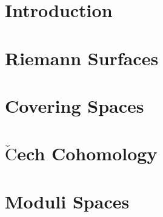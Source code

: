 \documentclass[a4paper, 8pt, notitlepage]{extreport}
\begin{document}
    

    \chapter{Introduction}\label{I}
    
    

    \chapter{Riemann Surfaces}\label{RS}
    
    

    \chapter{Covering Spaces}\label{CS}
    
    

    \chapter{$\check{\textrm{C}}$ech Cohomology}\label{CC}
    
    
    

    \chapter{Moduli Spaces}\label{MS}
    
    

    
\end{document}
